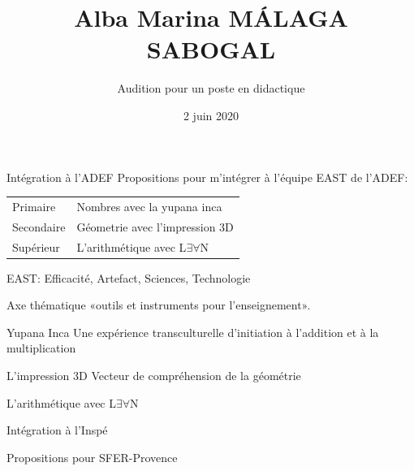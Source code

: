 \documentclass[
  french,
  ignorenonframetext,
]{beamer}
\title{Alba Marina MÁLAGA SABOGAL}
\author{Audition pour un poste en didactique}
\date{2 juin 2020}
\begin{document}
\frame{\titlepage}

\begin{frame}{Intégration à l'ADEF}
\protect\hypertarget{intuxe9gration-uxe0-ladef}{}
Propositions pour m'intégrer à l'équipe EAST de l'ADEF:

\begin{longtable}[]{@{}ll@{}}
\toprule
\endhead
Primaire & Nombres avec la yupana inca\tabularnewline
Secondaire & Géometrie avec l'impression 3D\tabularnewline
Supérieur & L'arithmétique avec L\(∃∀\)N\tabularnewline
\bottomrule
\end{longtable}

EAST: Efficacité, Artefact, Sciences, Technologie

Axe thématique «outils et instruments pour l'enseignement».
\end{frame}

\begin{frame}
\begin{block}{Yupana Inca}
\protect\hypertarget{yupana-inca}{}
Une expérience transculturelle d'initiation à l'addition et à la
multiplication
\end{block}
\end{frame}

\begin{frame}
\begin{block}{L'impression 3D}
\protect\hypertarget{limpression-3d}{}
Vecteur de compréhension de la géométrie
\end{block}
\end{frame}

\begin{frame}
\begin{block}{L'arithmétique avec L\(∃∀\)N}
\protect\hypertarget{larithmuxe9tique-avec-ln}{}
\end{block}
\end{frame}

\begin{frame}{Intégration à l'Inspé}
\protect\hypertarget{intuxe9gration-uxe0-linspuxe9}{}
\end{frame}

\begin{frame}{Propositions pour SFER-Provence}
\protect\hypertarget{propositions-pour-sfer-provence}{}
\end{frame}
\end{document}
